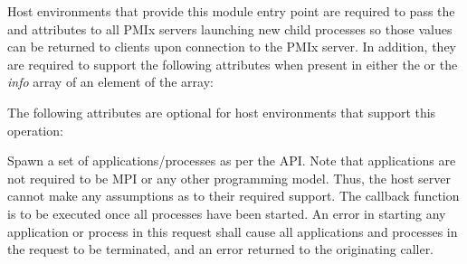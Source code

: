 
Host environments that provide this module entry point are required to pass the  and  attributes to all \ac{PMIx} servers launching new child processes so those values can be returned to clients upon connection to the \ac{PMIx} server. In addition, they are required to support the following attributes when present in either the  or the \textit{info} array of an element of the  array:


\reqattrend

\optattrstart
The following attributes are optional for host environments that support this operation:


\optattrend

\descr

Spawn a set of applications/processes as per the  API.
Note that applications are not required to be \ac{MPI} or any other programming model.
Thus, the host server cannot make any assumptions as to their required support.
The callback function is to be executed once all processes have been started.
An error in starting any application or process in this request shall cause all applications and processes in the request to be terminated, and an error returned to the originating caller.

